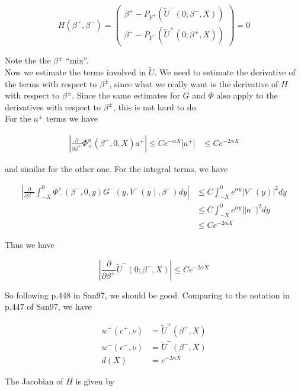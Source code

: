 \documentclass[12pt]{article}
\begin{document}
\begin{equation}
H(\beta^+, \beta^-) = 
\begin{pmatrix}
\beta^+ - P_{Y^+}(\tilde{U}^-(0; \beta^-, X)) \\
\beta^- - P_{Y^-}(\tilde{U}^+(0; \beta^+, X)) 
\end{pmatrix}
= 0
\end{equation}

Note the the $\beta^\pm$ ``mix''.\\

Now we estimate the terms involved in $\tilde{U}$. We need to estimate the derivative of the terms with respect to $\beta^\pm$, since what we really want is the derivative of $H$ with respect to $\beta^\pm$. Since the same estimates for $G$ and $\Phi$ also apply to the derivatives with respect to $\beta^\pm$, this is not hard to do.\\

For the $a^\pm$ terms we have

\begin{align*}
\left| \frac{\partial}{\partial \beta^+} \Phi^u_+(\beta^+, 0, X) a^+ \right| \leq C e^{-\alpha X}|a^+|
& \leq C  e^{-2 \alpha X}
\end{align*}

and similar for the other one. For the integral terms, we have

\begin{align*}
\left| \frac{\partial}{\partial \beta^-} \int_{-X}^0 \Phi_-^s(\beta^-, 0, y) G^-(y, V^-(y),\beta^-)dy \right| 
&\leq C \int_{-X}^0 e^{\alpha y} | V^-(y) |^2 dy \\
&\leq C \int_{-X}^0 e^{\alpha y} | |a^-|^2 dy \\
&\leq C e^{-2 \alpha X}
\end{align*}

Thus we have

\[
\left| \frac{\partial}{\partial \beta^\pm} \tilde{U}^-(0; \beta^-, X) \right| 
\leq C e^{-2 \alpha X}
\]

So following p.448 in San97, we should be good. Comparing to the notation in p.447 of San97, we have

\begin{align*}
w^+(c^+, \nu) &= \tilde{U}^+(\beta^+, X) \\
w^-(c^-, \nu) &= \tilde{U}^-(\beta^-, X) \\
d(X) &= e^{-2 \alpha X}
\end{align*}

The Jacobian of $H$ is given by 
\end{document}

